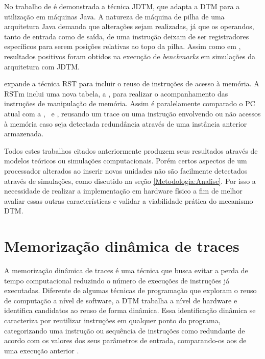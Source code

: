 No trabalho de  é demonstrada a técnica JDTM, que adapta a DTM para a utilização em máquinas Java. A natureza de máquina de pilha de uma arquitetura Java demanda que alterações sejam realizadas, já que os operandos, tanto de entrada como de saída, de uma instrução deixam de ser registradores específicos para serem posições relativas ao topo da pilha. Assim como em , resultados positivos foram obtidos na execução de \textit{benchmarks} em simulações da arquitetura com JDTM.

 expande a técnica RST para incluir o reuso de instruções de acesso à memória. A RSTm inclui uma nova tabela, a \tablel, para realizar o acompanhamento das instruções de manipulação de memória. Assim é paralelamente comparado o PC atual com a \tableg, \tablet\ e \tablel, reusando um trace ou uma instrução envolvendo ou não acessos à memória caso seja detectada redundância através de uma instância anterior armazenada.


Todos estes trabalhos citados anteriormente produzem seus resultados através de modelos teóricos ou simulações computacionais. Porém certos aspectos de um processador alterados ao inserir novas unidades não são facilmente detectados através de simulações, como discutido na seção \ref{Metodologia:Analise}. Por isso a necessidade de realizar a implementação em hardware físico a fim de melhor avaliar essas outras características e validar a viabilidade prática do mecanismo DTM.

\section{Memorização dinâmica de traces}
\label{Fundamentacao:DTM}

A memorização dinâmica de traces é uma técnica que busca evitar a perda de tempo computacional reduzindo o número de execuções de instruções já executadas. Diferente de algumas técnicas de programação que exploram o reuso de computação a nível de software, a DTM trabalha a nível de hardware e identifica candidatos ao reuso de forma dinâmica. Essa identificação dinâmica se caracteriza por reutilizar instruções em qualquer ponto do programa, categorizando uma instrução ou sequência de instruções como redundante de acordo com os valores dos seus parâmetros de entrada, comparando-os aos de uma execução anterior \cite{costa2001explorando}.

